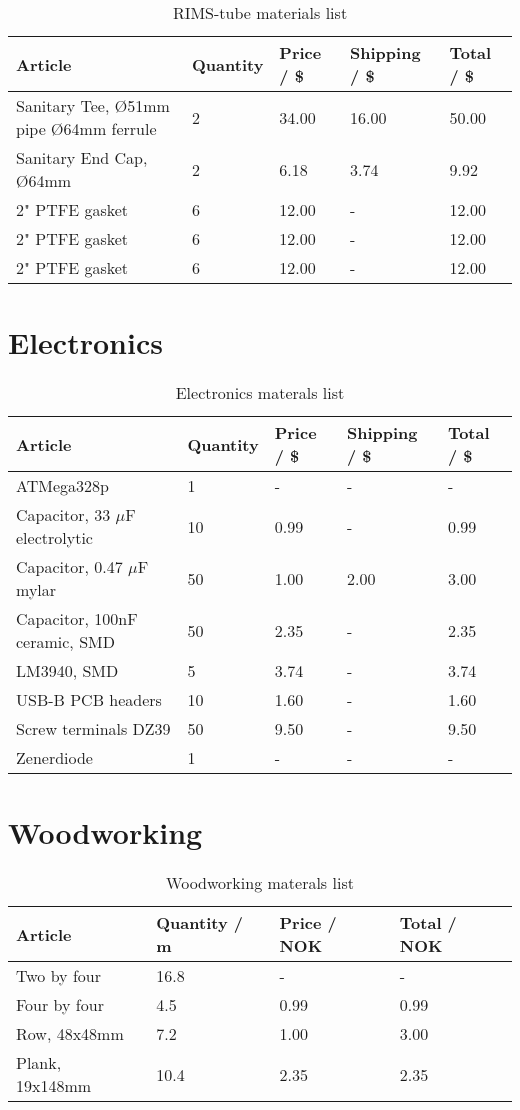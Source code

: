 \documentclass[11pt,fleqn]{book} %
\begin{document}
\begin{table}[h]
\centering
\begin{tabular}{l l l l l}
\toprule
Article & Quantity & Price / \$ & Shipping / \$ & Total / \$\\
\midrule
Sanitary Tee, Ø51mm pipe Ø64mm ferrule & 2 & 34.00 & 16.00 & 50.00 \\
Sanitary End Cap, Ø64mm & 2 & 6.18 & 3.74 & 9.92 \\
2" PTFE gasket & 6 & 12.00 & - & 12.00 \\
2" PTFE gasket & 6 & 12.00 & - & 12.00 \\
2" PTFE gasket & 6 & 12.00 & - & 12.00 \\
\bottomrule
\end{tabular}
\caption{RIMS-tube materials list}
\end{table}

\section{Electronics}

\begin{table}[h]
\centering
\begin{tabular}{l l l l l}
\toprule
Article & Quantity & Price / \$ & Shipping / \$ & Total / \$\\
\midrule
ATMega328p & 1 & - & - & - \\
Capacitor, 33 $\mu$F electrolytic & 10 & 0.99 & - & 0.99 \\
Capacitor, 0.47 $\mu$F mylar & 50 & 1.00 & 2.00 & 3.00 \\
Capacitor, 100nF ceramic, SMD & 50 & 2.35 & - & 2.35 \\
LM3940, SMD & 5 & 3.74 & - & 3.74 \\
USB-B PCB headers & 10 & 1.60 & - & 1.60 \\
Screw terminals DZ39 & 50 & 9.50 & - & 9.50 \\
Zenerdiode & 1 & - & - & - \\
\bottomrule
\end{tabular}
\caption{Electronics materals list}
\end{table}

\section{Woodworking}

\begin{table}[h]
\centering
\begin{tabular}{l l l l}
\toprule
Article & Quantity / m & Price / NOK & Total / NOK\\
\midrule
Two by four & 16.8 & - & - \\
Four by four & 4.5 & 0.99 & 0.99 \\
Row, 48x48mm & 7.2 & 1.00 & 3.00 \\
Plank, 19x148mm & 10.4 & 2.35 & 2.35 \\
\bottomrule
\end{tabular}
\caption{Woodworking materals list}
\end{table}
\end{document}
